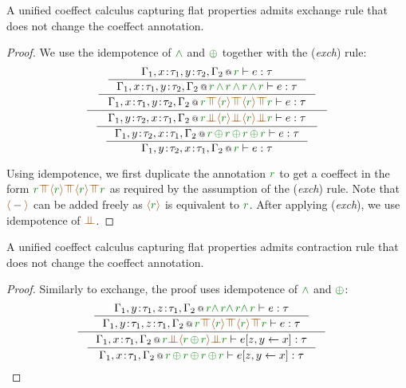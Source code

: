 \begin{lemma}
A unified coeffect calculus capturing flat properties admits exchange rule that does not change the
coeffect annotation.
\end{lemma}
\begin{proof}
We use the idempotence of $\czip$ and $\cpar$ together with the (\emph{exch}) rule:
\begin{equation*}
\inference
  { \inference
      { \inference
          {\coctx{\Gamma_1,x\!:\!\tau_1,y\!:\!\tau_2,\Gamma_2}{\cclrd{r}} \vdash e : \tau}
          {\coctx{\Gamma_1,x\!:\!\tau_1,y\!:\!\tau_2,\Gamma_2}{\cclrd{r} \,\czip\, \cclrd{r} \,\czip\, \cclrd{r} \,\czip\, \cclrd{r}} \vdash e : \tau} }
      { \coctx{\Gamma_1,x\!:\!\tau_1,y\!:\!\tau_2,\Gamma_2}{\cclrd{r} \azip \alift{\cclrd{r}} \azip \alift{\cclrd{r}} \azip \cclrd{r}} \vdash e : \tau } }
  { \inference
      {\coctx{\Gamma_1,y\!:\!\tau_2,x\!:\!\tau_1,\Gamma_2}{\cclrd{r} \apar \alift{\cclrd{r}} \apar \alift{\cclrd{r}} \apar \cclrd{r}} \vdash e : \tau}
      {\inference
         {\coctx{\Gamma_1,y\!:\!\tau_2,x\!:\!\tau_1,\Gamma_2}{\cclrd{r}\,\cpar\,\cclrd{r}\,\cpar\,\cclrd{r}\,\cpar\,\cclrd{r}} \vdash e : \tau}
         {\coctx{\Gamma_1,y\!:\!\tau_2,x\!:\!\tau_1,\Gamma_2}{\cclrd{r}} \vdash e : \tau} } }
\end{equation*}

\noindent
Using idempotence, we first duplicate the annotation $\cclrd{r}$ to get a coeffect in the form
$\cclrd{r} \azip \alift{\cclrd{r}} \azip \alift{\cclrd{r}} \azip \cclrd{r}$ as required by the
assumption of the (\emph{exch}) rule. Note that $\alift{-}$ can be added freely as
$\alift{\cclrd{r}}$ is equivalent to $\cclrd{r}$. After applying (\emph{exch}), we use
idempotence of $\apar$.
\end{proof}

\begin{lemma}
A unified coeffect calculus capturing flat properties admits contraction rule that does not change the
coeffect annotation.
\end{lemma}
\begin{proof}
Similarly to exchange, the proof uses idempotence of $\czip$ and $\cpar$:
\begin{equation*}
\inference
  { \inference
      {\coctx{\Gamma_1,y\!:\!\tau_1,z\!:\!\tau_1,\Gamma_2}{\cclrd{r} \czip\, \cclrd{r} \czip\, \cclrd{r} \czip\, \cclrd{r}} \vdash e : \tau}
      {\coctx{\Gamma_1,y\!:\!\tau_1,z\!:\!\tau_1,\Gamma_2}{\cclrd{r} \azip \alift{\cclrd{r}} \azip \alift{\cclrd{r}} \azip \cclrd{r}} \vdash e : \tau} }
  { \inference
      {\coctx{\Gamma_1,x\!:\!\tau_1,\Gamma_2}{\cclrd{r} \apar \alift{\cclrd{r} \,\cpar\, \cclrd{r}} \apar \cclrd{r}} \vdash \subst{e}{z,y}{x} : \tau}
      {\coctx{\Gamma_1,x\!:\!\tau_1,\Gamma_2}{\cclrd{r} \,\cpar\, \cclrd{r} \,\cpar\, \cclrd{r} \,\cpar\, \cclrd{r}} \vdash \subst{e}{z,y}{x} : \tau} }
\begin{array}{r} \\[2.5em] \qedhere \end{array}
\end{equation*}
\end{proof}

